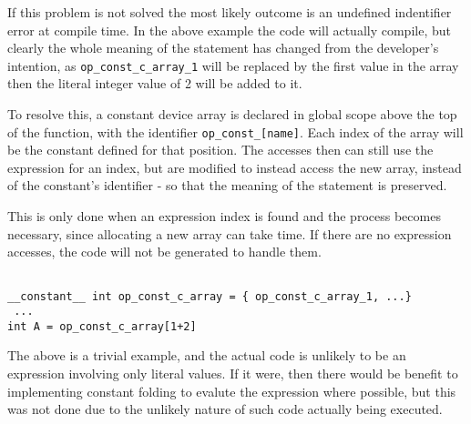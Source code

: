 If this problem is not solved the most likely outcome is an undefined indentifier error at compile time. In the above example the code will actually compile, but clearly the whole meaning of the statement has changed from the developer's intention, as \verb|op_const_c_array_1| will be replaced by the first value in the array then the literal integer value of 2 will be added to it.
\par
To resolve this, a constant device array is declared in global scope above the top of the function, with the identifier \verb|op_const_[name]|. Each index of the array will be the constant defined for that position. The accesses then can still use the expression for an index, but are modified to instead access the new array, instead of the constant's identifier - so that the meaning of the statement is preserved.
\par This is only done when an expression index is found and the process becomes necessary, since allocating a new array can take time. If there are no expression accesses, the code will not be generated to handle them.
\begin{lstlisting}[frame=none,backgroundcolor=\color{white}]

__constant__ int op_const_c_array = { op_const_c_array_1, ...}
 ...
int A = op_const_c_array[1+2]
\end{lstlisting}
The above is a trivial example, and the actual code is unlikely to be an expression involving only literal values. If it were, then there would be benefit to implementing constant folding to evalute the expression where possible, but this was not done due to the unlikely nature of such code actually being executed.
\par

